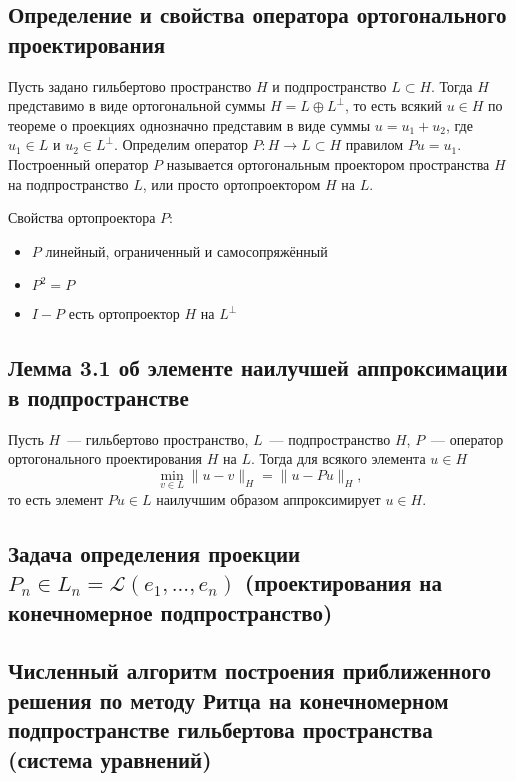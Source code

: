 \documentclass[a4paper,14pt]{article} %
\begin{document}

\subsection{Определение и свойства оператора ортогонального проектирования}

Пусть задано гильбертово пространство $H$ и подпространство $L \subset H$.
Тогда $H$ представимо в виде ортогональной суммы $H = L \oplus L^\perp$, то есть
всякий $u \in H$ по теореме о проекциях однозначно представим в виде суммы
$u = u_1 + u_2$, где $u_1 \in L$ и $u_2 \in L^\perp$.
Определим оператор $P : H \to L \subset H$
правилом $Pu = u_1$.
Построенный оператор $P$ называется ортогональным проектором пространства $H$ на подпространство $L$,
или просто ортопроектором $H$ на $L$.

Свойства ортопроектора $P$:
\begin{itemize}
	\item
		$P$ линейный, ограниченный и самосопряжённый
	\item
		$P^2 = P$
	\item
		$I-P$ есть ортопроектор $H$ на $L^\perp$
\end{itemize}

\subsection{Лемма 3.1 об элементе наилучшей аппроксимации в подпространстве}

Пусть $H$~--- гильбертово пространство,
$L$~--- подпространство $H$,
$P$~--- оператор ортогонального проектирования $H$ на $L$.
Тогда для всякого элемента $u \in H$
\begin{equation}
	\min_{v\in L} \|u - v\|_H = \|u - P u\|_H,
\end{equation}
то есть элемент $Pu \in L$ наилучшим образом аппроксимирует $u \in H$.

\subsection{Задача определения проекции $P_n\in L_n = \mathcal{L}(e_1,...,e_n)$ (проектирования на конечномерное подпространство)}

\subsection{Численный алгоритм построения приближенного решения по методу Ритца на конечномерном подпространстве гильбертова пространства (система уравнений)}
\end{document}
